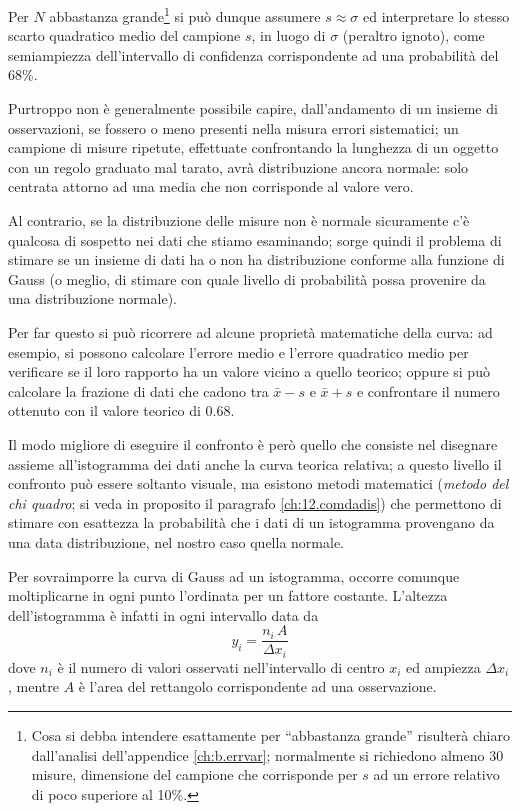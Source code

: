 Per $N$ abbastanza grande\/\footnote{Cosa si debba intendere
  esattamente per ``abbastanza grande'' risulter\`a chiaro
  dall'analisi dell'appendice \ref{ch:b.errvar}; normalmente
  si richiedono almeno 30 misure, dimensione del campione
  che corrisponde per $s$ ad un errore relativo di poco
  superiore al 10\%.}  si pu\`o dunque assumere $ s \approx
\sigma $ ed interpretare lo stesso scarto quadratico medio
del campione $s$, in luogo di $\sigma$ (peraltro ignoto),
come semiampiezza dell'intervallo di confidenza
corrispondente ad una probabilit\`a del 68\%.

%
Purtroppo non \`e generalmente possibile capire,
dall'andamento di un insieme di osservazioni, se fossero o
meno presenti nella misura errori sistematici; un campione
di misure ripetute, effettuate confrontando la lunghezza di
un oggetto con un regolo graduato mal tarato, avr\`a
distribuzione ancora normale: solo centrata attorno ad una
media che non corrisponde al valore vero.

Al contrario, se la distribuzione delle misure non \`e
normale sicuramente c'\`e qualcosa di sospetto nei dati che
stiamo esaminando; sorge quindi il problema di stimare se un
insieme di dati ha o non ha distribuzione conforme alla
funzione di Gauss (o meglio, di stimare con quale livello di
probabilit\`a possa provenire da una distribuzione normale).

Per far questo si pu\`o ricorrere ad alcune propriet\`a
matematiche della curva: ad esempio, si possono calcolare
l'errore medio e l'errore quadratico medio per verificare se
il loro rapporto ha un valore vicino a quello teorico;
oppure si pu\`o calcolare la frazione di dati che cadono tra
$\bar x - s$ e $\bar x + s$ e confrontare il numero ottenuto
con il valore teorico di 0.68.

Il modo migliore di eseguire il confronto \`e per\`o quello
che consiste nel disegnare assieme all'istogramma dei dati
anche la curva teorica relativa; a questo livello il
confronto pu\`o essere soltanto visuale, ma esistono metodi
matematici (\emph{metodo del chi quadro};%
si veda in proposito il paragrafo \ref{ch:12.comdadis}) che
permettono di stimare con esattezza la probabilit\`a che i
dati di un istogramma provengano da una data distribuzione,
nel nostro caso quella normale.%

%
Per sovraimporre la curva di Gauss ad un istogramma, occorre
comunque moltiplicarne in ogni punto l'ordinata per un
fattore costante.  L'altezza dell'istogramma \`e infatti in
ogni intervallo data da
\begin{equation*}
  y_i = \frac{n_i \, A}{\Delta x_i}
\end{equation*}
dove $n_i$ \`e il numero di valori osservati nell'intervallo
di centro $x_i$ ed ampiezza $\Delta x_i$, mentre $A$ \`e
l'area del rettangolo corrispondente ad una osservazione.

